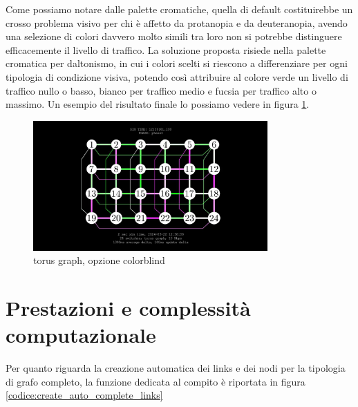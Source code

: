 \documentclass[binding=0.6cm]{sapthesis}
\begin{document}
Come possiamo notare dalle palette cromatiche, quella di default costituirebbe un crosso problema visivo per chi è affetto da protanopia e da deuteranopia, avendo
una selezione di colori davvero molto simili tra loro non si potrebbe distinguere efficacemente il livello di traffico. La soluzione proposta
risiede nella palette cromatica per daltonismo, in cui i colori scelti si riescono a differenziare per ogni tipologia di condizione visiva, potendo così
attribuire al colore verde un livello di traffico nullo o basso, bianco per traffico medio e fucsia per traffico alto o massimo. Un esempio
del risultato finale lo possiamo vedere in figura \ref{fig:colorblind_torus}.

\begin{figure}[h]
    \centering
    \includegraphics[width=0.8\textwidth]{immagini/colorblind_torus.JPG}
    \caption{torus graph, opzione colorblind}
    \label{fig:colorblind_torus}
\end{figure}

\chapter{Prestazioni e complessità computazionale}


Per quanto riguarda la creazione automatica dei links e dei nodi
per la tipologia di grafo completo, la funzione dedicata al compito è riportata in figura \ref{codice:create_auto_complete_links}
\end{document}
